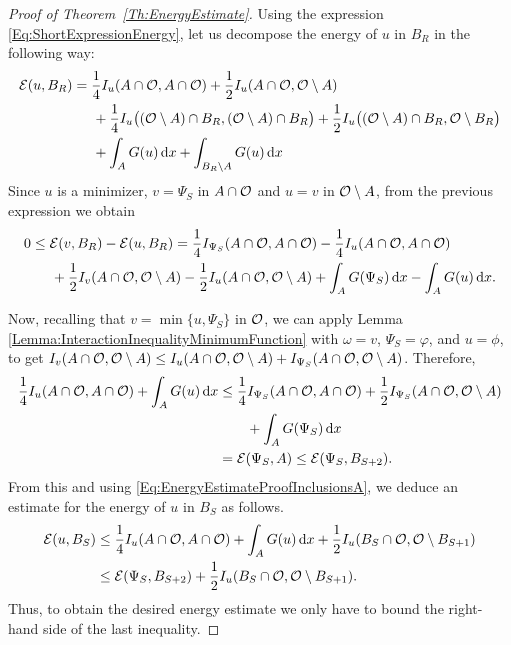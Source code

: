 \begin{proof}[Proof of Theorem~\ref{Th:EnergyEstimate}]
Using the expression \eqref{Eq:ShortExpressionEnergy}, let us decompose the energy of $u$ in $B_R$ in the following way:
\begin{align*}
\mathcal{E}(u,B_R) &= \frac{1}{4}I_u(A \cap \mathcal{O}, A \cap \mathcal{O}) + \frac{1}{2}I_u(A \cap \mathcal{O}, \mathcal{O} \setminus A) \\
& \hspace{5mm} + \frac{1}{4}I_u\big((\mathcal{O} \setminus A) \cap B_R, (\mathcal{O} \setminus A) \cap B_R\big) + \frac{1}{2}I_u\big((\mathcal{O} \setminus A) \cap B_R, \mathcal{O} \setminus B_R\big) \\
& \hspace{5mm} + \int_A G(u) \,\mathrm{d} x + \int_{B_R\setminus A} G(u) \,\mathrm{d} x
\end{align*}
Since $u$ is a minimizer, $v=\Psi_S$ in $A\cap \mathcal{O}$ and $u=v$ in $\mathcal{O}\setminus A$,  from the previous expression we obtain
\begin{align*}
0 &\leq \mathcal{E}(v,B_R)-\mathcal{E}(u,B_R) = \frac{1}{4}I_{\Psi_S}(A \cap \mathcal{O}, A \cap \mathcal{O}) - \frac{1}{4}I_u(A \cap \mathcal{O}, A \cap \mathcal{O})\\
& \hspace{5mm} +  \frac{1}{2} I_v(A \cap \mathcal{O}, \mathcal{O} \setminus A) -  \frac{1}{2} I_u(A \cap \mathcal{O}, \mathcal{O} \setminus A) + \int_A G(\Psi_S) \,\mathrm{d} x - \int_{A} G(u) \,\mathrm{d} x.
\end{align*}

Now, recalling that $v = \min\{u,\Psi_S\}$ in $\mathcal{O}$, we can apply Lemma \ref{Lemma:InteractionInequalityMinimumFunction} with $\omega = v$, $\Psi_S = \varphi$, and $u= \phi$, to get $I_v(A \cap \mathcal{O}, \mathcal{O}\setminus A) \leq I_u(A \cap \mathcal{O}, \mathcal{O}\setminus A) + I_{\Psi_S}(A \cap \mathcal{O}, \mathcal{O}\setminus A)$. Therefore,
\begin{align*}
\frac{1}{4}I_u(A \cap \mathcal{O}, A \cap \mathcal{O}) + \int_{A} G(u) \,\mathrm{d} x &\leq \frac{1}{4}I_{\Psi_S}(A \cap \mathcal{O}, A \cap \mathcal{O}) +  \frac{1}{2} I_{\Psi_S}(A \cap \mathcal{O}, \mathcal{O} \setminus A) \\
& \quad \quad  + \int_A G(\Psi_S)  \,\mathrm{d} x \\
&= \mathcal{E}(\Psi_S, A) \leq \mathcal{E}(\Psi_S,B_{S+2}).
\end{align*}
From this and using \eqref{Eq:EnergyEstimateProofInclusionsA}, we deduce an estimate for the energy of $u$ in $B_S$ as follows.
\begin{align*}
\mathcal{E}(u,B_S) &\leq \frac{1}{4}I_u(A \cap \mathcal{O}, A \cap \mathcal{O}) + \int_{A} G(u) \,\mathrm{d} x +  \frac{1}{2} I_u(B_S \cap \mathcal{O}, \mathcal{O} \setminus B_{S+1}) \\
& \leq  \mathcal{E}(\Psi_S,B_{S+2}) +  \frac{1}{2} I_u(B_S \cap \mathcal{O}, \mathcal{O} \setminus B_{S+1}).
\end{align*}
Thus, to obtain the desired energy estimate we only have to bound the right-hand side of the last inequality.



\end{proof}
